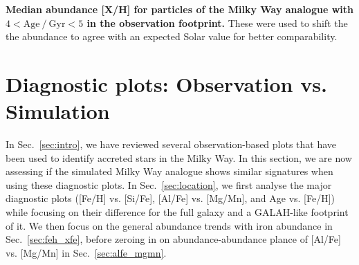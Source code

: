 \documentclass[fleqn,usenatbib]{mnras}
\begin{document}
\begin{table}
    \centering
    \caption{
    \textbf{Median abundance [X/H] for particles of the Milky Way analogue with $4 < \mathrm{Age~/~Gyr} < 5$ in the observation footprint.}
    These were used to shift the the abundance to agree with an expected Solar value for better comparability.
    }
    
    \label{tab:shift_4to5gyr}
\end{table}


\section{Diagnostic plots: Observation vs. Simulation}
\label{sec:comparison}

In Sec.~\ref{sec:intro}, we have reviewed several observation-based plots that have been used to identify accreted stars in the Milky Way. In this section, we are now assessing if the simulated Milky Way analogue shows similar signatures when using these diagnostic plots. In Sec.~\ref{sec:location}, we first analyse the major diagnostic plots ([Fe/H] vs. [Si/Fe], [Al/Fe] vs. [Mg/Mn], and Age vs. [Fe/H]) while focusing on their difference for the full galaxy and a GALAH-like footprint of it. We then focus on the general abundance trends with iron abundance in Sec.~\ref{sec:feh_xfe}, before zeroing in on abundance-abundance plance of [Al/Fe] vs. [Mg/Mn] in Sec.~\ref{sec:alfe_mgmn}.
\end{document}
